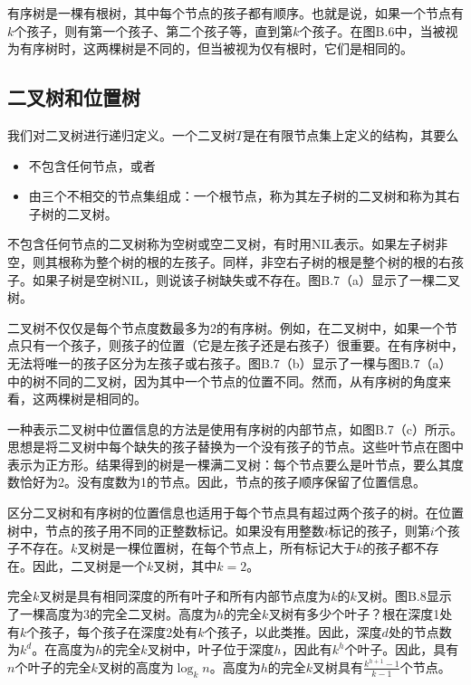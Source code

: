 \documentclass[lang=cn,newtx,10pt,scheme=chinese]{elegantbook}
\begin{document}
有序树是一棵有根树，其中每个节点的孩子都有顺序。也就是说，如果一个节点有$k$个孩子，则有第一个孩子、第二个孩子等，直到第$k$个孩子。在图B.6中，当被视为有序树时，这两棵树是不同的，但当被视为仅有根时，它们是相同的。

\subsection{二叉树和位置树}

我们对二叉树进行递归定义。一个二叉树$T$是在有限节点集上定义的结构，其要么

\begin{itemize}
\item 不包含任何节点，或者
\item 由三个不相交的节点集组成：一个根节点，称为其左子树的二叉树和称为其右子树的二叉树。
\end{itemize}

不包含任何节点的二叉树称为空树或空二叉树，有时用NIL表示。如果左子树非空，则其根称为整个树的根的左孩子。同样，非空右子树的根是整个树的根的右孩子。如果子树是空树NIL，则说该子树缺失或不存在。图B.7（a）显示了一棵二叉树。

二叉树不仅仅是每个节点度数最多为2的有序树。例如，在二叉树中，如果一个节点只有一个孩子，则孩子的位置（它是左孩子还是右孩子）很重要。在有序树中，无法将唯一的孩子区分为左孩子或右孩子。图B.7（b）显示了一棵与图B.7（a）中的树不同的二叉树，因为其中一个节点的位置不同。然而，从有序树的角度来看，这两棵树是相同的。

一种表示二叉树中位置信息的方法是使用有序树的内部节点，如图B.7（c）所示。思想是将二叉树中每个缺失的孩子替换为一个没有孩子的节点。这些叶节点在图中表示为正方形。结果得到的树是一棵满二叉树：每个节点要么是叶节点，要么其度数恰好为2。没有度数为1的节点。因此，节点的孩子顺序保留了位置信息。

区分二叉树和有序树的位置信息也适用于每个节点具有超过两个孩子的树。在位置树中，节点的孩子用不同的正整数标记。如果没有用整数$i$标记的孩子，则第$i$个孩子不存在。$k$叉树是一棵位置树，在每个节点上，所有标记大于$k$的孩子都不存在。因此，二叉树是一个$k$叉树，其中$k=2$。

完全$k$叉树是具有相同深度的所有叶子和所有内部节点度为$k$的$k$叉树。图B.8显示了一棵高度为3的完全二叉树。高度为$h$的完全$k$叉树有多少个叶子？根在深度1处有$k$个孩子，每个孩子在深度2处有$k$个孩子，以此类推。因此，深度$d$处的节点数为$k^d$。在高度为$h$的完全$k$叉树中，叶子位于深度$h$，因此有$k^h$个叶子。因此，具有$n$个叶子的完全$k$叉树的高度为$\log_k n$。高度为$h$的完全$k$叉树具有$\frac{k^{h+1}-1}{k-1}$个节点。
\end{document}
